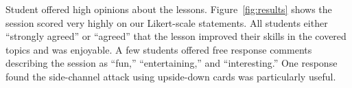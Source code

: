 Student offered high opinions about the lessons. Figure~\ref{fig:results}
shows the session scored very highly on our Likert-scale statements.
All students
either ``strongly agreed'' or ``agreed''
that the lesson improved their skills in the covered topics
and was enjoyable.
A few students offered free response comments describing the
session as ``fun,'' ``entertaining,'' and ``interesting.''  One response
found the side-channel attack using upside-down cards
was particularly useful.





%
%


